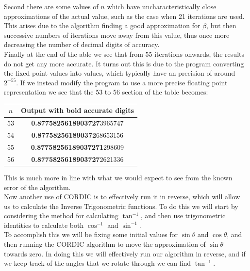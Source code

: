 {Second there are some values of \(n\) which have uncharacteristically close approximations of the actual value, such as the case when 21 iterations are used. This arises due to the algorithm finding a good approximation for \(\beta\), but then successive numbers of iterations move away from this value, thus once more decreasing the number of decimal digits of accuracy.\\

Finally at the end of the able we see that from 55 iterations onwards, the results do not get any more accurate. It turns out this is due to the program converting the  fixed point values into  values, which typically have an precision of around \(2^{-55}\). If we instead modify the program to use a more precise floating point representation we see that the 53 to 56 section of the table becomes:

{\selectfont
\begin{center}
\begin{tabular}{|c|c|}
	\hline
	\(n\) & \textsf{Output with bold accurate digits}\\\hline
	53 & \textbf{0.8775825618903727}3965747\\\hline
	54 & \textbf{0.877582561890372}68653156\\\hline
	55 & \textbf{0.87758256189037271}298609\\\hline
	56 & \textbf{0.8775825618903727}2621336\\\hline
\end{tabular}
\end{center}}

This is much more in line with what we would expect to see from the known error of the algorithm.\\

Now another use of CORDIC is to effectively run it in reverse, which will allow us to calculate the Inverse Trigonometric functions. To do this we will start by considering the method for calculating \(\tan^{-1}\), and then use trigonometric identities to calculate both \(\cos^{-1}\) and \(\sin^{-1}\).\\

To accomplish this we will be fixing some initial values for \(\sin\theta\) and \(\cos\theta\), and then running the CORDIC algorithm to move the approximation of \(\sin\theta\) towards zero. In doing this we will effectively run our algorithm in reverse, and if we keep track of the angles that we rotate through we can find \(\tan^{-1}\).\\

}
